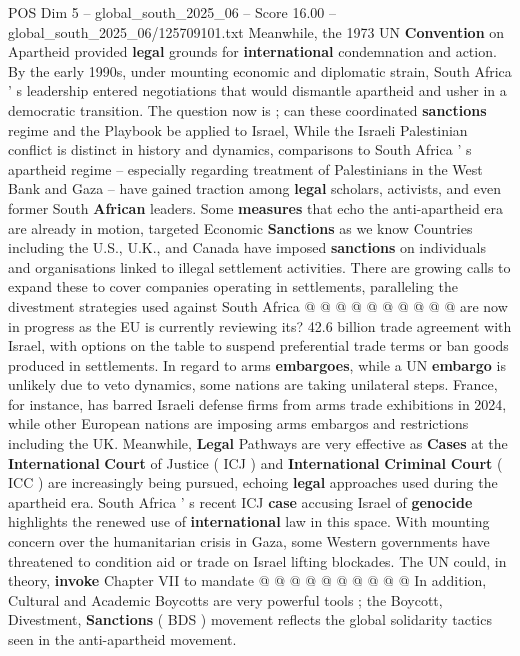 \begin{textsample}{POS Dim 5 – global\_south\_2025\_06 – Score 16.00 – global\_south\_2025\_06/125709101.txt}
Meanwhile, the 1973 UN \textbf{Convention} on Apartheid provided \textbf{legal} grounds for \textbf{international} condemnation and action.
By the early 1990s, under mounting economic and diplomatic strain, South Africa ' s leadership entered negotiations that would dismantle apartheid and usher in a democratic transition.
The question now is ; can these coordinated \textbf{sanctions} regime and the Playbook be applied to Israel, While the Israeli Palestinian conflict is distinct in history and dynamics, comparisons to South Africa ' s apartheid regime -- especially regarding treatment of Palestinians in the West Bank and Gaza -- have gained traction among \textbf{legal} scholars, activists, and even former South \textbf{African} leaders.
Some \textbf{measures} that echo the anti-apartheid era are already in motion, targeted Economic \textbf{Sanctions} as we know Countries including the U.S., U.K., and Canada have imposed \textbf{sanctions} on individuals and organisations linked to illegal settlement activities.
There are growing calls to expand these to cover companies operating in settlements, paralleling the divestment strategies used against South Africa @ @ @ @ @ @ @ @ @ @ are now in progress as the EU is currently reviewing its? 42.6 billion trade agreement with Israel, with options on the table to suspend preferential trade terms or ban goods produced in settlements.
In regard to arms \textbf{embargoes}, while a UN \textbf{embargo} is unlikely due to veto dynamics, some nations are taking unilateral steps.
France, for instance, has barred Israeli defense firms from arms trade exhibitions in 2024, while other European nations are imposing arms embargos and restrictions including the UK.
Meanwhile, \textbf{Legal} Pathways are very effective as \textbf{Cases} at the \textbf{International} \textbf{Court} of Justice ( ICJ ) and \textbf{International} \textbf{Criminal} \textbf{Court} ( ICC ) are increasingly being pursued, echoing \textbf{legal} approaches used during the apartheid era.
South Africa ' s recent ICJ \textbf{case} accusing Israel of \textbf{genocide} highlights the renewed use of \textbf{international} law in this space.
With mounting concern over the humanitarian crisis in Gaza, some Western governments have threatened to condition aid or trade on Israel lifting blockades.
The UN could, in theory, \textbf{invoke} Chapter VII to mandate @ @ @ @ @ @ @ @ @ @ In addition, Cultural and Academic Boycotts are very powerful tools ; the Boycott, Divestment, \textbf{Sanctions} ( BDS ) movement reflects the global solidarity tactics seen in the anti-apartheid movement.

\end{textsample}
